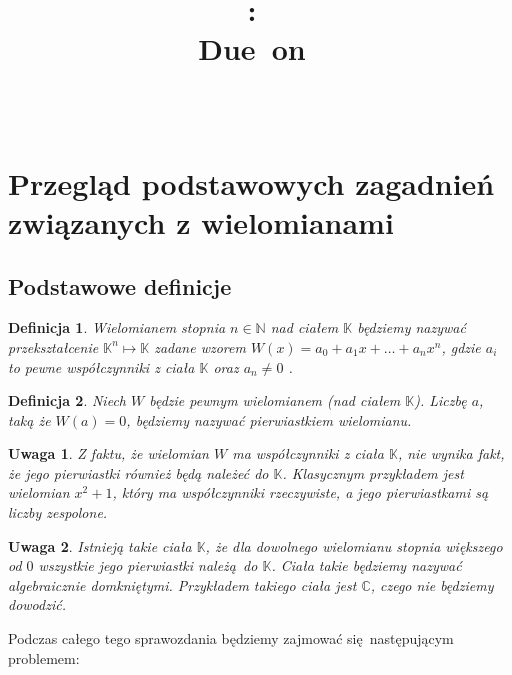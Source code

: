 \documentclass{article}
\title{
\vspace{2in}
\textmd{\textbf{\hmwkClass:\ \hmwkTitle}}\\
\normalsize\vspace{0.1in}\small{Due\ on\ \hmwkDueDate}\\
\vspace{0.1in}\large{\textit{\hmwkClassInstructor\ \hmwkClassTime}}
\vspace{3in}
}
\author{\textbf{\hmwkAuthorName}}
\date{} %
\newtheorem{remark}{Uwaga}
\newtheorem{definicja}{Definicja}
\begin{document}
\tableofcontents

\section{Przegląd podstawowych zagadnień związanych z wielomianami}

\subsection{Podstawowe definicje}

\begin{definicja}
Wielomianem stopnia $n \in \mathbb{N}$ nad ciałem $\mathbb{K}$ będziemy nazywać przekształcenie $\mathbb{K}^n \mapsto \mathbb{K}$ zadane wzorem $W(x) = a_0 + a_1x + \ldots + a_n x^n$, gdzie $a_i$ to pewne  współczynniki z ciała $\mathbb{K}$ oraz $a_n \neq 0$ .
\end{definicja}

\begin{definicja}
Niech $W$ będzie pewnym wielomianem (nad ciałem $\mathbb{K}$). Liczbę $a$, taką że $W(a) = 0$, będziemy nazywać pierwiastkiem wielomianu.
\end{definicja}

\begin{remark}
Z faktu, że wielomian $W$ ma współczynniki z ciała $\mathbb{K}$, nie wynika fakt, że jego pierwiastki również będą należeć do $\mathbb{K}$. Klasycznym przykładem jest wielomian $x^2 + 1$, który ma współczynniki rzeczywiste, a jego pierwiastkami są liczby zespolone.
\end{remark}

\begin{remark}
Istnieją takie ciała $\mathbb{K}$, że dla dowolnego wielomianu stopnia większego od $0$ wszystkie jego pierwiastki należą do $\mathbb{K}$. Ciała takie będziemy nazywać algebraicznie domkniętymi. Przykładem takiego ciała jest $\mathbb{C}$, czego nie będziemy dowodzić. 
\end{remark}

Podczas całego tego sprawozdania będziemy zajmować się następującym problemem:

\begin{center}
\end{center}
\end{document}
